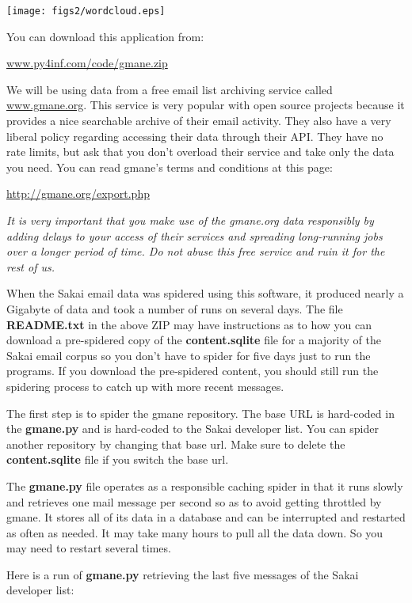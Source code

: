 \beforefig
\centerline{\texttt{[image: figs2/wordcloud.eps]}}
\afterfig

You can download this application from:

\url{www.py4inf.com/code/gmane.zip}

We will be using data from a free email list archiving service called 
\url{www.gmane.org}.  This service is very popular with open source
projects because it provides a nice searchable archive of their 
email activity.  They also have a very liberal policy regarding accessing 
their data through their API.  They have no rate limits, but ask that you 
don't overload their service and take only the data you need.  You can read
gmane's terms and conditions at this page:

\url{http://gmane.org/export.php}

{\em It is very important that you make use of the gmane.org data
responsibly by adding delays to your access of their services and spreading
long-running jobs over a longer period of time.  Do not abuse this free service
and ruin it for the rest of us.}

When the Sakai email data was spidered using this software, it produced nearly 
a Gigabyte of data and took a number of runs on several days.
The file {\bf README.txt} in the above ZIP may have instructions as to how
you can download a pre-spidered copy of the {\bf content.sqlite} file for 
a majority of the Sakai email corpus so you don't have to spider for 
five days just to run the programs.  If you download the pre-spidered
content, you should still run the spidering process to catch up with 
more recent messages.

The first step is to spider the gmane repository.  The base URL 
is hard-coded in the {\bf gmane.py} and is hard-coded to the Sakai
developer list.  You can spider another repository by changing that
base url.   Make sure to delete the {\bf content.sqlite} file if you 
switch the base url.  

The {\bf gmane.py} file operates as a responsible caching spider in 
that it runs slowly and retrieves one mail message per second so 
as to avoid getting throttled by gmane.   It stores all of
its data in a database and can be interrupted and restarted 
as often as needed.   It may take many hours to pull all the data
down.  So you may need to restart several times.

Here is a run of {\bf gmane.py} retrieving the last five messages of the
Sakai developer list:

